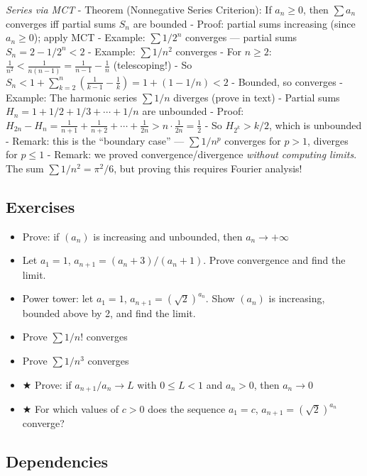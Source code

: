 \documentclass[
  10pt,
  letterpaper,
]{scrbook}
\providecommand{\tightlist}{%
  \setlength{\itemsep}{0pt}\setlength{\parskip}{0pt}}
\begin{document}
\emph{Series via MCT} - Theorem (Nonnegative Series Criterion): If
\(a_n \geq 0\), then \(\sum a_n\) converges iff partial sums \(S_n\) are
bounded - Proof: partial sums increasing (since \(a_n \geq 0\)); apply
MCT - Example: \(\sum 1/2^n\) converges --- partial sums
\(S_n = 2 - 1/2^n < 2\) - Example: \(\sum 1/n^2\) converges - For
\(n \geq 2\):
\(\frac{1}{n^2} < \frac{1}{n(n-1)} = \frac{1}{n-1} - \frac{1}{n}\)
(telescoping!) - So
\(S_n < 1 + \sum_{k=2}^{n}\left(\frac{1}{k-1} - \frac{1}{k}\right) = 1 + (1 - 1/n) < 2\)
- Bounded, so converges - Example: The harmonic series \(\sum 1/n\)
diverges (prove in text) - Partial sums
\(H_n = 1 + 1/2 + 1/3 + \cdots + 1/n\) are unbounded - Proof:
\(H_{2n} - H_n = \frac{1}{n+1} + \frac{1}{n+2} + \cdots + \frac{1}{2n} > n \cdot \frac{1}{2n} = \frac{1}{2}\)
- So \(H_{2^k} > k/2\), which is unbounded - Remark: this is the
``boundary case'' --- \(\sum 1/n^p\) converges for \(p > 1\), diverges
for \(p \leq 1\) - Remark: we proved convergence/divergence
\emph{without computing limits}. The sum \(\sum 1/n^2 = \pi^2/6\), but
proving this requires Fourier analysis!

\subsection{Exercises}\label{exercises-8}

\begin{itemize}
\tightlist
\item
  Prove: if \((a_n)\) is increasing and unbounded, then
  \(a_n \to +\infty\)
\item
  Let \(a_1 = 1\), \(a_{n+1} = (a_n + 3)/(a_n + 1)\). Prove convergence
  and find the limit.
\item
  Power tower: let \(a_1 = 1\), \(a_{n+1} = (\sqrt{2})^{a_n}\). Show
  \((a_n)\) is increasing, bounded above by 2, and find the limit.
\item
  Prove \(\sum 1/n!\) converges
\item
  Prove \(\sum 1/n^3\) converges
\item
  ★ Prove: if \(a_{n+1}/a_n \to L\) with \(0 \leq L < 1\) and
  \(a_n > 0\), then \(a_n \to 0\)
\item
  ★ For which values of \(c > 0\) does the sequence \(a_1 = c\),
  \(a_{n+1} = (\sqrt{2})^{a_n}\) converge?
\end{itemize}

\subsection{Dependencies}\label{dependencies-8}
\end{document}

